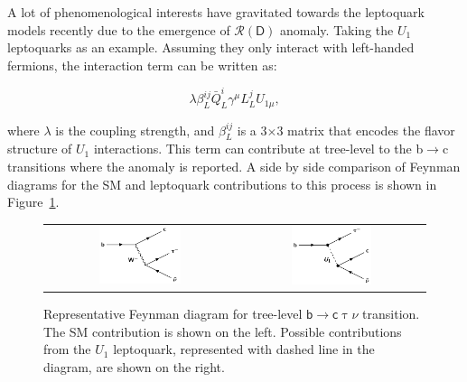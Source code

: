 A lot of phenomenological interests have gravitated towards the leptoquark models recently due to the emergence of $\mathcal{R}(\textsf{D})$ anomaly. Taking the $U_{1}$ leptoquarks as an example. Assuming they only interact with left-handed fermions, the interaction term can be written as:

\begin{equation}
\lambda\beta^{ij}_{L}\bar{Q}_{L}^{i}\gamma^{\mu}L_{L}^{j}U_{1\mu},
\end{equation}

where $\lambda$ is the coupling strength, and $\beta^{ij}_{L}$ is a 3$\times$3 matrix that encodes the flavor structure of $U_{1}$ interactions. This term can contribute at tree-level to the b$\rightarrow$c transitions where the anomaly is reported. A side by side comparison of Feynman diagrams for the \ac{SM} and leptoquark contributions to this process is shown in Figure~\ref{fig:Leptoquark}.

\begin{figure}[tbh!]
 \begin{center}
 \begin{tabular}{cc}
 \includegraphics[width=0.45\textwidth]{figures/Part1/BSM/SMbtoc}&
 \includegraphics[width=0.45\textwidth]{figures/Part1/BSM/U1}\\
 \end{tabular}
 \caption{Representative Feynman diagram for tree-level $\textsf{b}\rightarrow\textsf{c}\uptau\nu$ transition. The \ac{SM} contribution is shown on the left. Possible contributions from the $U_{1}$ leptoquark, represented with dashed line in the diagram, are shown on the right.}
 \label{fig:Leptoquark}
 \end{center}
\end{figure}

